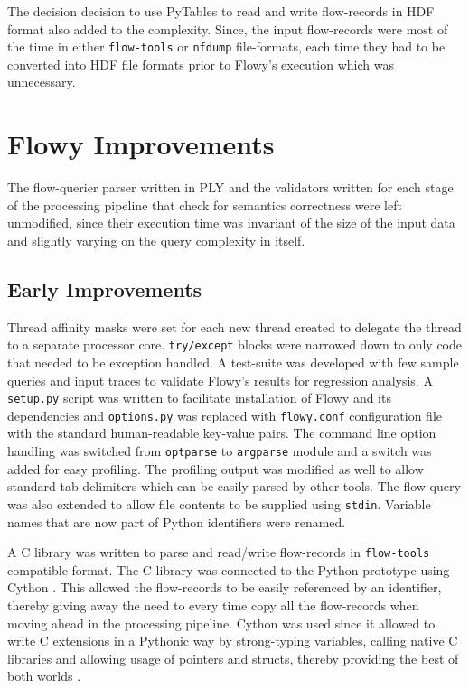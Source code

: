 The decision decision to use PyTables to read and write flow-records in \ac{HDF} format also added to the complexity. Since, the input flow-records were most of the time  in either \texttt{flow-tools} or \texttt{nfdump} file-formats, each time they had to be converted into \ac{HDF} file formats prior to Flowy's execution which was unnecessary.

\section{Flowy Improvements}\label{sec:flowy-improvements}
The flow-querier parser written in \ac{PLY} and the validators written for each stage of the processing pipeline that check for semantics correctness were left unmodified, since their execution time was invariant of the size of the input data and slightly varying on the query complexity in itself.

\subsection{Early Improvements}\label{subsec:early-improvements}
Thread affinity masks were set for each new thread created to delegate the thread to a separate processor core. \texttt{try/except} blocks were narrowed down to only code that needed to be exception handled. A test-suite was developed with few sample queries and input traces to validate Flowy's results for regression analysis. A \texttt{setup.py} script was written to facilitate installation of  Flowy and its dependencies and \texttt{options.py} was replaced with \texttt{flowy.conf} configuration file with the standard human-readable key-value pairs. The command line option handling was switched from \texttt{optparse} to \texttt{argparse} module and a switch was added for easy profiling. The profiling output was modified as well to allow standard tab delimiters which can be easily parsed by other tools. The flow query was also  extended to allow file contents to be supplied using \texttt{stdin}. Variable names that are now part of Python identifiers were renamed.

A C library was written to parse and read/write flow-records in \texttt{flow-tools} compatible format. The C library was connected to the Python prototype using Cython \cite{dseljebotn:2009}\cite{wilbers:2009}. This allowed the flow-records to be easily referenced by an  identifier, thereby giving away the need to every time copy all the flow-records when moving ahead in the processing pipeline. Cython was used since it allowed to write C extensions in a Pythonic way by strong-typing variables, calling native C libraries and allowing usage of pointers and structs, thereby providing the best of both worlds \cite{sbehnel:2011}.

